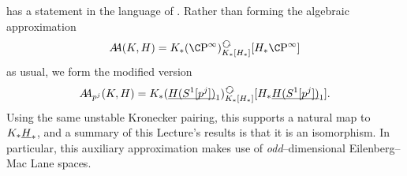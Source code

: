 \begin{remark}
 has a statement in the language of .  Rather than forming the algebraic approximation \[\AA(K, H) = K_*(\CP^\infty)_{K_*[H_*]}^{\circulatearrows}[H_* \CP^\infty]\] as usual, we form the modified version \[\AA_{p^j}(K, H) = K_*(\OS{H(S^1[p^j])}{1})_{K_*[H_*]}^{\circulatearrows}[H_* \OS{H(S^1[p^j])}{1}].\]  Using the same unstable Kronecker pairing, this supports a natural map to \(K_* \underline{\smash{H}}_{*}\), and a summary of this Lecture's results is that it is an isomorphism.  In particular, this auxiliary approximation makes use of \emph{odd}--dimensional Eilenberg--Mac Lane spaces.
\end{remark}











